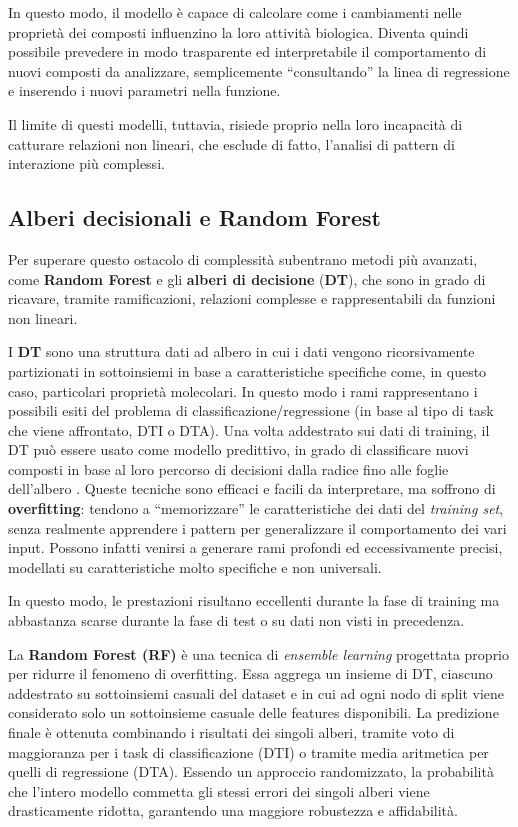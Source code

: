 In questo modo, il modello è capace di calcolare come i cambiamenti nelle
proprietà dei composti influenzino la loro attività biologica. Diventa
quindi possibile prevedere in modo trasparente ed interpretabile il comportamento di nuovi composti da analizzare,
semplicemente ``consultando'' la linea di regressione e inserendo i nuovi
parametri nella funzione.

Il limite di questi modelli, tuttavia, risiede proprio nella loro incapacità di catturare  relazioni non lineari, che esclude di fatto, l'analisi di pattern di interazione più complessi.
\subsection{Alberi decisionali e Random Forest}
Per superare questo ostacolo di complessità subentrano metodi più avanzati,
come \textbf{Random Forest} e gli \textbf{alberi di decisione} (\textbf{DT}),
che sono in grado di ricavare, tramite ramificazioni, relazioni complesse e rappresentabili
da funzioni non lineari.

I \textbf{DT} sono una struttura dati ad albero in cui i dati vengono
ricorsivamente partizionati in sottoinsiemi in base a caratteristiche
specifiche come, in questo caso, particolari proprietà molecolari.
In questo modo i rami rappresentano i possibili esiti del
problema di classificazione/regressione (in base al tipo di task che viene
affrontato, DTI o DTA).
Una volta addestrato sui dati di training, il DT può essere usato come modello predittivo,
in grado di classificare nuovi composti in base al loro percorso di decisioni
dalla radice fino alle foglie dell'albero
\cite{odugbemiArtificialIntelligenceAntidiabetic2024}.
Queste tecniche sono efficaci e facili da interpretare, ma soffrono di
\textbf{overfitting}: tendono a ``memorizzare'' le caratteristiche dei
dati del \textit{training set}, senza realmente apprendere i pattern
per generalizzare il comportamento dei vari input.
Possono infatti venirsi a generare rami profondi ed eccessivamente precisi, modellati su caratteristiche molto specifiche e non universali.

In questo modo, le
prestazioni risultano eccellenti durante la fase di training ma abbastanza
scarse durante la fase di test o su dati non visti in precedenza.

La \textbf{Random Forest (RF)} è una tecnica di \textit{ensemble learning}
progettata proprio per ridurre il fenomeno di overfitting. Essa aggrega un insieme di DT, ciascuno addestrato su sottoinsiemi casuali del dataset e in cui ad ogni nodo di split viene considerato solo un sottoinsieme casuale delle features disponibili.
La predizione finale è ottenuta combinando i risultati dei singoli alberi, tramite voto di maggioranza per i task di classificazione (DTI) o tramite media aritmetica per quelli di regressione (DTA).
Essendo un approccio randomizzato, la probabilità che l'intero modello commetta gli stessi errori dei singoli alberi viene drasticamente ridotta, garantendo una maggiore robustezza e affidabilità.

